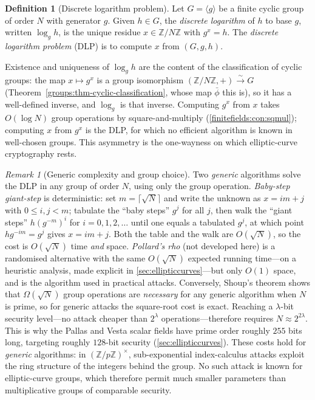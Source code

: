 \documentclass[11pt,a4paper]{article}
\theoremstyle{definition}
\newtheorem{definition}[theorem]{Definition}
\theoremstyle{remark}
\newtheorem{remark}[theorem]{Remark}
\newcommand{\Z}{\ensuremath{\mathbb{Z}}}
\providecommand{\ceil}[1]{\lceil #1 \rceil}
\begin{document}
\begin{definition}[Discrete logarithm problem]\label{numbertheory:def:dlp}
Let \(G = \langle g \rangle\) be a finite cyclic group of order \(N\)
with generator \(g\). Given \(h \in G\), the \emph{discrete logarithm}
of \(h\) to base \(g\), written \(\log_g h\), is the unique residue
\(x \in \Z/N\Z\) with \(g^x = h\). The \emph{discrete logarithm
problem} (DLP) is to compute \(x\) from \((G, g, h)\).
\end{definition}

Existence and uniqueness of \(\log_g h\) are the content of the
classification of cyclic groups: the map \(x \mapsto g^x\) is a group
isomorphism \((\Z/N\Z, +) \xrightarrow{\;\sim\;} G\)
(Theorem~\ref{groups:thm-cyclic-classification}, whose map \(\bar\phi\)
this is), so it has a well-defined inverse, and \(\log_g\) is that
inverse. Computing \(g^x\) from \(x\) takes \(O(\log N)\) group
operations by square-and-multiply (\cref{finitefields:con:sqmul});
computing \(x\) from \(g^x\) is the DLP, for which no efficient
algorithm is known in well-chosen groups. This asymmetry is the
one-wayness on which elliptic-curve cryptography rests.

\begin{remark}[Generic complexity and group choice]
\label{numbertheory:rem:dlp-generic}
Two \emph{generic} algorithms solve the DLP in any group of order
\(N\), using only the group operation. \emph{Baby-step
giant-step} is deterministic: set \(m = \ceil{\sqrt N}\) and write the
unknown as \(x = im + j\) with \(0 \le i, j < m\); tabulate the ``baby
steps'' \(g^j\) for all \(j\), then walk the ``giant steps''
\(h (g^{-m})^i\) for \(i = 0, 1, 2, \dots\) until one equals a
tabulated \(g^j\), at which point \(h g^{-im} = g^j\) gives
\(x = im + j\). Both the table and the walk are \(O(\sqrt N)\), so the
cost is \(O(\sqrt N)\) time \emph{and} space. \emph{Pollard's rho}
(not developed here) is a randomised alternative with the same
\(O(\sqrt N)\) expected running time---on a heuristic analysis, made
explicit in \cref{sec:ellipticcurves}---but only \(O(1)\) space, and
is the algorithm used in practical attacks. Conversely, Shoup's
theorem shows that \(\Omega(\sqrt N)\) group operations are
\emph{necessary} for any generic algorithm when \(N\) is prime, so for
generic attacks the square-root cost is exact. Reaching a
\(\lambda\)-bit security level---no attack cheaper than \(2^\lambda\)
operations---therefore requires \(N \approx 2^{2\lambda}\). This is why
the Pallas and Vesta scalar fields have prime order roughly \(255\)
bits long, targeting roughly \(128\)-bit security
(\cref{sec:ellipticcurves}). These costs hold for \emph{generic}
algorithms: in \((\Z/p\Z)^\times\), sub-exponential index-calculus
attacks exploit the ring structure of the integers behind the group. No
such attack is known for elliptic-curve groups, which therefore permit
much smaller parameters than multiplicative groups of comparable
security.
\end{remark}
\end{document}
